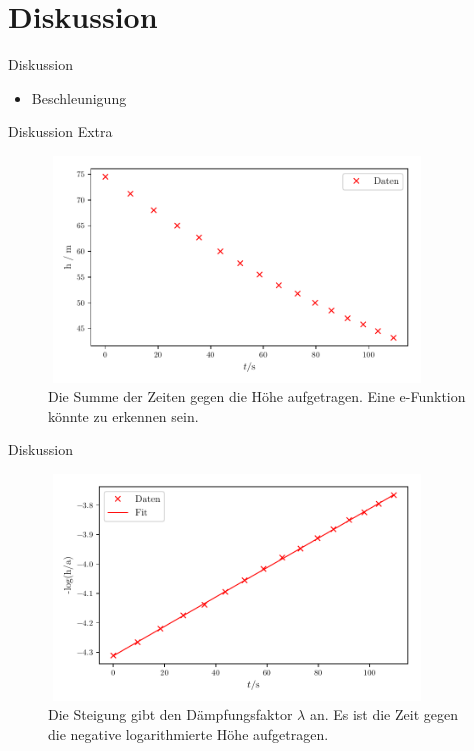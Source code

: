 \section{Diskussion}
\begin{frame}[t]{Diskussion}
    
    \begin{itemize}\pause
        \item Beschleunigung 
    \end{itemize}
\end{frame}


\begin{frame}{Diskussion Extra}
    \begin{figure}   
    
    \centering
    \includegraphics[width=10cm, height=6cm]{plotnew2.pdf}
    \caption{Die Summe der Zeiten gegen die Höhe aufgetragen. Eine e-Funktion könnte zu erkennen sein.} 

    \label{fig:plotnew2}
\end{figure}
\end{frame}


\begin{frame}{Diskussion}
    \begin{figure}   
    
    \centering
    \includegraphics[width=10cm, height=6cm]{plotnew1.pdf}
    \caption{Die Steigung gibt den Dämpfungsfaktor $\lambda$ an. Es ist die Zeit gegen die negative logarithmierte Höhe aufgetragen.} 

    \label{fig:plotnew1}
\end{figure}
\end{frame}


